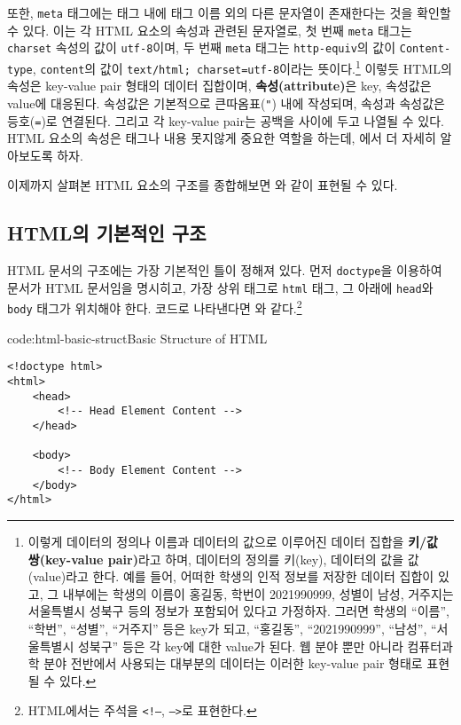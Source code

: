 또한, \texttt{meta} 태그에는 태그 내에 태그 이름 외의 다른 문자열이 존재한다는 것을 확인할 수 있다. 이는 각 HTML 요소의 속성과 관련된 문자열로, 첫 번째 \texttt{meta} 태그는 \texttt{charset} 속성의 값이 \texttt{utf-8}이며, 두 번째 \texttt{meta} 태그는 \texttt{http-equiv}의 값이 \texttt{Content-type}, \texttt{content}의 값이 \verb|text/html; charset=utf-8|이라는 뜻이다.\footnote{이렇게 데이터의 정의나 이름과 데이터의 값으로 이루어진 데이터 집합을 \textbf{키/값 쌍(key-value pair)}라고 하며, 데이터의 정의를 키(key), 데이터의 값을 값(value)라고 한다. 예를 들어, 어떠한 학생의 인적 정보를 저장한 데이터 집합이 있고, 그 내부에는 학생의 이름이 홍길동, 학번이 2021990999, 성별이 남성, 거주지는 서울특별시 성북구 등의 정보가 포함되어 있다고 가정하자. 그러면 학생의 ``이름'', ``학번'', ``성별'', ``거주지'' 등은 key가 되고, ``홍길동'', ``2021990999'', ``남성'', ``서울특별시 성북구'' 등은 각 key에 대한 value가 된다. 웹 분야 뿐만 아니라 컴퓨터과학 분야 전반에서 사용되는 대부분의 데이터는 이러한 key-value pair 형태로 표현될 수 있다.} 이렇듯 HTML의 속성은 key-value pair 형태의 데이터 집합이며, \textbf{속성(attribute)}은 key, 속성값은 value에 대응된다. 속성값은 기본적으로 큰따옴표(\texttt{"}) 내에 작성되며, 속성과 속성값은 등호(\texttt{=})로 연결된다. 그리고 각 key-value pair는 공백을 사이에 두고 나열될 수 있다. HTML 요소의 속성은 태그나 내용 못지않게 중요한 역할을 하는데, 에서 더 자세히 알아보도록 하자.

이제까지 살펴본 HTML 요소의 구조를 종합해보면 와 같이 표현될 수 있다.

    {}

\subsection*{HTML의 기본적인 구조}
HTML 문서의 구조에는 가장 기본적인 틀이 정해져 있다. 먼저 \texttt{doctype}을 이용하여 문서가 HTML 문서임을 명시히고, 가장 상위 태그로 \texttt{html} 태그, 그 아래에 \texttt{head}와 \texttt{body} 태그가 위치해야 한다. 코드로 나타낸다면 와 같다.\footnote{HTML에서는 주석을 \texttt{<!--}, \texttt{-->}로 표현한다.}

\begin{codeenv}{code:html-basic-struct}{Basic Structure of HTML}
\begin{verbatim}
<!doctype html>
<html>
    <head>
        <!-- Head Element Content -->
    </head>

    <body>
        <!-- Body Element Content -->
    </body>
</html>
\end{verbatim}
\end{codeenv}

